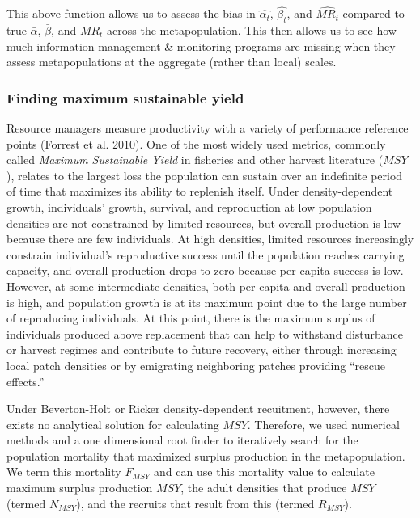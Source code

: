 \documentclass[
]{article}
\begin{document}
This above function allows us to assess the bias in \(\hat{\alpha_t}\),
\(\hat{\beta_t}\), and \(\hat{MR_t}\) compared to true \(\bar{\alpha}\),
\(\bar{\beta}\), and \({MR}_t\) across the metapopulation. This then
allows us to see how much information management \& monitoring programs
are missing when they assess metapopulations at the aggregate (rather
than local) scales.

\hypertarget{finding-maximum-sustainable-yield}{%
\subsubsection{Finding maximum sustainable
yield}\label{finding-maximum-sustainable-yield}}

Resource managers measure productivity with a variety of performance
reference points (Forrest et al. 2010). One of the most widely used
metrics, commonly called \emph{Maximum Sustainable Yield} in fisheries
and other harvest literature (\(MSY\)), relates to the largest loss the
population can sustain over an indefinite period of time that maximizes
its ability to replenish itself. Under density-dependent growth,
individuals' growth, survival, and reproduction at low population
densities are not constrained by limited resources, but overall
production is low because there are few individuals. At high densities,
limited resources increasingly constrain individual's reproductive
success until the population reaches carrying capacity, and overall
production drops to zero because per-capita success is low. However, at
some intermediate densities, both per-capita and overall production is
high, and population growth is at its maximum point due to the large
number of reproducing individuals. At this point, there is the maximum
surplus of individuals produced above replacement that can help to
withstand disturbance or harvest regimes and contribute to future
recovery, either through increasing local patch densities or by
emigrating neighboring patches providing ``rescue effects.''

Under Beverton-Holt or Ricker density-dependent recuitment, however,
there exists no analytical solution for calculating \(MSY\). Therefore,
we used numerical methods and a one dimensional root finder to
iteratively search for the population mortality that maximized surplus
production in the metapopulation. We term this mortality \(F_{MSY}\) and
can use this mortality value to calculate maximum surplus production
\(MSY\), the adult densities that produce \(MSY\) (termed \(N_{MSY}\)),
and the recruits that result from this (termed \(R_{MSY}\)).
\end{document}
